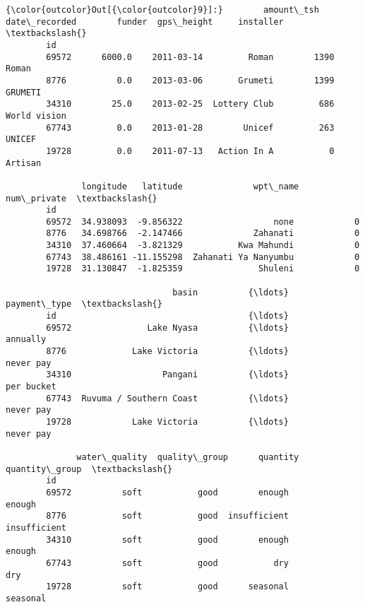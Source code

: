 \documentclass[11pt]{article}
\begin{document}
\begin{Verbatim}[commandchars=\\\{\}]
{\color{outcolor}Out[{\color{outcolor}9}]:}        amount\_tsh date\_recorded        funder  gps\_height     installer  \textbackslash{}
        id                                                                        
        69572      6000.0    2011-03-14         Roman        1390         Roman   
        8776          0.0    2013-03-06       Grumeti        1399       GRUMETI   
        34310        25.0    2013-02-25  Lottery Club         686  World vision   
        67743         0.0    2013-01-28        Unicef         263        UNICEF   
        19728         0.0    2011-07-13   Action In A           0       Artisan   
        
               longitude   latitude              wpt\_name  num\_private  \textbackslash{}
        id                                                               
        69572  34.938093  -9.856322                  none            0   
        8776   34.698766  -2.147466              Zahanati            0   
        34310  37.460664  -3.821329           Kwa Mahundi            0   
        67743  38.486161 -11.155298  Zahanati Ya Nanyumbu            0   
        19728  31.130847  -1.825359               Shuleni            0   
        
                                 basin          {\ldots}          payment\_type  \textbackslash{}
        id                                      {\ldots}                         
        69572               Lake Nyasa          {\ldots}              annually   
        8776             Lake Victoria          {\ldots}             never pay   
        34310                  Pangani          {\ldots}            per bucket   
        67743  Ruvuma / Southern Coast          {\ldots}             never pay   
        19728            Lake Victoria          {\ldots}             never pay   
        
              water\_quality  quality\_group      quantity quantity\_group  \textbackslash{}
        id                                                                
        69572          soft           good        enough         enough   
        8776           soft           good  insufficient   insufficient   
        34310          soft           good        enough         enough   
        67743          soft           good           dry            dry   
        19728          soft           good      seasonal       seasonal   
        

\end{Verbatim}
\end{document}
